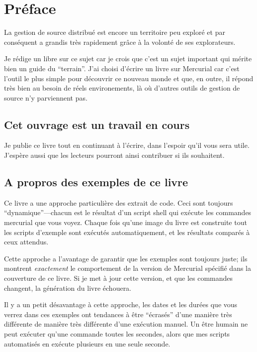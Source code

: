 \chapter*{Préface}
\label{chap:preface}

La gestion de source distribué est encore un territoire peu exploré
et par conséquent a grandis très rapidement grâce à la volonté de
ses explorateurs.

Je rédige un libre sur ce sujet car je crois que c'est un sujet 
important qui mérite bien un guide du ``terrain''. J'ai choisi d'écrire
un livre sur Mercurial car c'est l'outil le plus simple pour découvrir
ce nouveau monde et que, en outre, il répond très bien au besoin de
réels environements, là où d'autres outils de gestion de source n'y
parviennent pas.

\section{Cet ouvrage est un travail en cours}

Je publie ce livre tout en continuant à l'écrire, dans l'espoir qu'il
vous sera utile. J'espère aussi que les lecteurs pourront ainsi contribuer
si ils souhaitent.

\section{A propros des exemples de ce livre}

Ce livre a une approche particulière des extrait de code. Ceci sont 
toujours ``dynamique''---chacun est le résultat d'un script shell qui
exécute les commandes mercurial que vous voyez. Chaque fois qu'une 
image du livre est construite tout les scripts d'exemple sont exécutés
automatiquement, et les résultats comparés à ceux attendus.

Cette approche a l'avantage de garantir que les exemples sont toujours
juste; ils montrent \emph{exactement} le comportement de la version de
Mercurial spécifié dans la couverture de ce livre. Si je met à jour cette
version, et que les commandes changent, la génération du livre échouera.

Il y a un petit désavantage à cette approche, les dates et les
durées que vous verrez dans ces exemples ont tendances à être
``écrasés'' d'une manière très différente de manière très différente
d'une exécution manuel. Un être humain ne peut exécuter qu'une commande
toutes les secondes, alors que mes scripts automatisés en exécute
plusieurs en une seule seconde.


